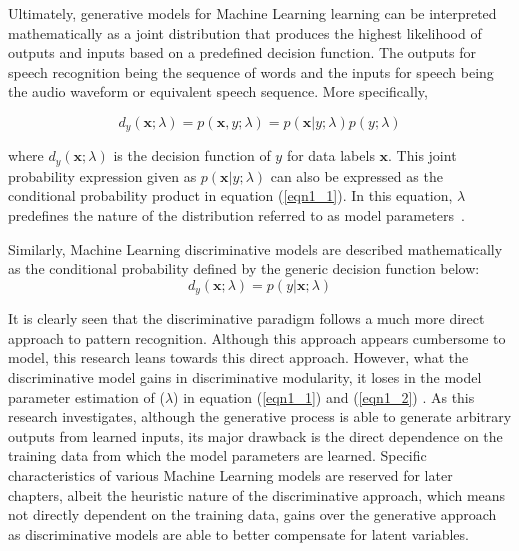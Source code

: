 Ultimately, generative models for Machine Learning learning can be interpreted mathematically as a joint distribution that produces the highest likelihood of outputs and inputs based on a predefined decision function.  The outputs for speech recognition being the sequence of words and the inputs for speech being the audio waveform or equivalent speech sequence. More specifically,

\begin{equation}
d_y(\mathbf{x};\lambda)=p(\mathbf{x},y;\lambda)=p(\mathbf{x}|y;\lambda)p(y;\lambda)
\label{eqn1_1}
\end{equation}

where $d_y(\mathbf{x};\lambda)$ is the decision function of $y$ for data labels $\mathbf{x}$.  This joint probability expression given as $p(\mathbf{x}|y;\lambda)$ can also be expressed as the conditional probability product in equation (\ref{eqn1_1}).  In this equation, $\lambda$ predefines the nature of the distribution referred to as model parameters~\citep{deng2013machine}.

Similarly, Machine Learning discriminative models are described mathematically as the conditional probability defined by the generic decision function below:
\begin{equation}
d_y(\mathbf{x};\lambda)=p(y|\mathbf{x};\lambda)
\label{eqn1_2}
\end{equation}

It is clearly seen that the discriminative paradigm follows a much more direct approach to pattern recognition. Although this approach appears cumbersome to model, this research leans towards this direct approach.  However, what the discriminative model gains in discriminative modularity, it loses in the model parameter estimation of ($\lambda$) in equation  (\ref{eqn1_1}) and (\ref{eqn1_2}) \citep{gales2012structured}.  
 As this research investigates, although the generative process is able to generate arbitrary outputs from learned inputs, its major drawback is the direct dependence on the training data from which the model parameters are learned. Specific characteristics of various Machine Learning models are reserved for later chapters, albeit the heuristic nature of the discriminative approach, which means not directly dependent on the training data,  gains over the generative approach as discriminative models are able to better compensate for latent variables.  
 
